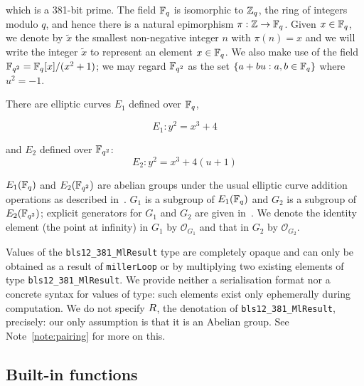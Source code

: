 \noindent which is a 381-bit prime. The field $\mathbb{F}_q$ is isomorphic to $\mathbb{Z}_q$, the ring of
integers modulo $q$, and hence there is a natural epimorphism
$\pi:\mathbb{Z} \rightarrow \mathbb{F}_q$.  Given $x \in \mathbb{F}_q$, we denote by $\tilde{x}$ the
smallest non-negative integer $n$ with $\pi(n) = x$ and we will write the
integer $\tilde{x}$ to represent an element $x \in \mathbb{F}_q$.  We also make use of
the field $\mathbb{F}_{q^2} = \mathbb{F}_q[x]/(x^2+1)$; we may regard $\mathbb{F}_{q^2}$ as the set $\{a+bu:
a,b \in \mathbb{F}_q\}$ where $u^2=-1$.

\medskip\noindent There are elliptic curves $E_1$ defined over $\mathbb{F}_q$,

$$
E_1: y^2 = x^3 + 4
$$

\noindent and $E_2$ defined over $\mathbb{F}_{q^2}$:
$$
E_2: y^2 = x^3 + 4(u+1)
$$

\noindent $E_1(\mathbb{F}_q)$ and  $E_2(\mathbb{F}_{q^2})$  are abelian groups under the
usual elliptic curve addition operations as described
in~\cite[III.2]{Silverman-Arithmetic-EC}.  $G_1$ is a subgroup of $E_1(\mathbb{F}_q)$ and
$G_2$ is a subgroup of $E_2(\mathbb{F}_{q^2})$; explicit generators for $G_1$ and $G_2$ are
given in~\cite[4.2.1]{IETF-pairing-friendly-curves}.  We denote the identity
element (the point at infinity) in $G_1$ by $\mathcal{O}_{G_1}$ and
that in $G_2$ by $\mathcal{O}_{G_2}$.

\bigskip
\noindent Values of the \texttt{bls12\_381\_MlResult} type are completely
opaque and can only be obtained as a result of \texttt{millerLoop} or by
multiplying two existing elements of type \texttt{bls12\_381\_MlResult}.  We
provide neither a serialisation format nor a concrete syntax for values of type:
such elements exist only ephemerally during computation.  We do not specify
$R$, the denotation of \texttt{bls12\_381\_MlResult}, precisely: our
only assumption is that it is an Abelian group. See Note~\ref{note:pairing} for
more on this.

\subsection{Built-in functions}
\label{sec:future-built-in-functions}

\newcommand{\hash}{\mathsf{hash}}
\newcommand{\compress}{\mathsf{compress}}
\newcommand{\uncompress}{\mathsf{uncompress}}

